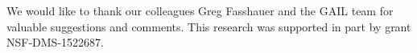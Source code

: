 \documentclass[review]{elsarticle}
\theoremstyle{definition}
\begin{document}
We would like to thank our colleagues Greg Fasshauer and the GAIL team for
valuable suggestions and comments. This research was supported in part by grant
NSF-DMS-1522687.





\end{document}
